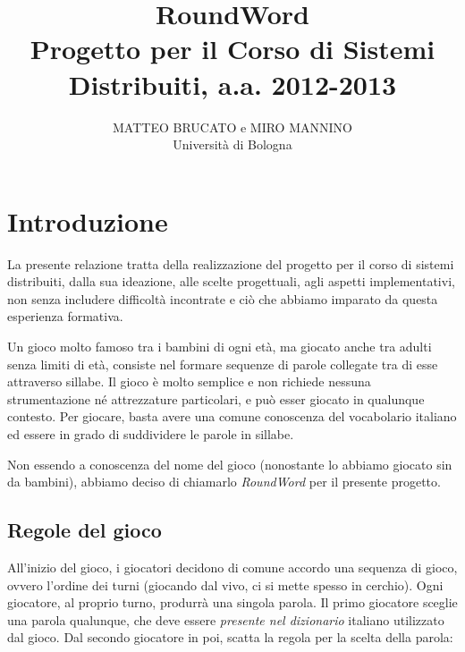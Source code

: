 \documentclass[10.5pt]{article}
\title{RoundWord\\
\large{Progetto per il Corso di Sistemi Distribuiti, a.a. 2012-2013}}
\author{MATTEO BRUCATO e MIRO MANNINO\\Università di Bologna}
\begin{document}

\maketitle

\begin{abstract}

\end{abstract}



\section{Introduzione}

La presente relazione tratta della realizzazione del progetto per il corso di sistemi distribuiti, dalla sua ideazione, alle scelte progettuali, agli aspetti implementativi, non senza includere difficoltà incontrate e ciò che abbiamo imparato da questa esperienza formativa.

Un gioco molto famoso tra i bambini di ogni età, ma giocato anche tra adulti senza limiti di età, consiste nel formare sequenze di parole collegate tra di esse attraverso sillabe. Il gioco è molto semplice e non richiede nessuna strumentazione né attrezzature particolari, e può esser giocato in qualunque contesto. Per giocare, basta avere una comune conoscenza del vocabolario italiano ed essere in grado di suddividere le parole in sillabe. 


Non essendo a conoscenza del nome del gioco (nonostante lo abbiamo giocato sin da bambini), abbiamo deciso di chiamarlo \emph{RoundWord} per il presente progetto.



\subsection{Regole del gioco}
All'inizio del gioco, i giocatori decidono di comune accordo una sequenza di gioco, ovvero l'ordine dei turni (giocando dal vivo, ci si mette spesso in cerchio). Ogni giocatore, al proprio turno, produrrà una singola parola. Il primo giocatore sceglie una parola qualunque, che deve essere \emph{presente nel dizionario} italiano utilizzato dal gioco. Dal secondo giocatore in poi, scatta la regola per la scelta della parola:
\end{document}
